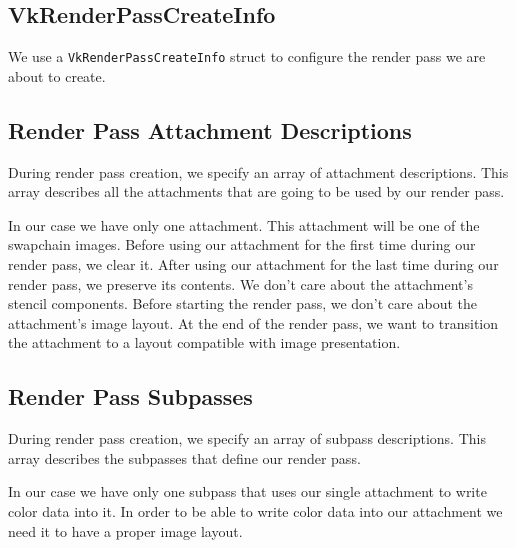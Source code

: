\subsection{VkRenderPassCreateInfo}

We use a \texttt{VkRenderPassCreateInfo} struct to configure the render pass we
are about to create.

\begin{minipage}{\linewidth}{\noindent}
    
\end{minipage}

\subsection{Render Pass Attachment Descriptions}

During render pass creation, we specify an array of attachment descriptions.
This array describes all the attachments that are going to be used by our
render pass.

In our case we have only one attachment.
This attachment will be one of the swapchain images.
Before using our attachment for the first time during our render pass, we clear it.
After using our attachment for the last time during our render pass, we preserve
its contents.
We don't care about the attachment's stencil components.
Before starting the render pass, we don't care about the attachment's image layout.
At the end of the render pass, we want to transition the attachment to a layout
compatible with image presentation.

\begin{minipage}{\linewidth}{\noindent}
    
\end{minipage}

\subsection{Render Pass Subpasses}

During render pass creation, we specify an array of subpass descriptions.
This array describes the subpasses that define our render pass.

In our case we have only one subpass that uses our single attachment to write
color data into it.
In order to be able to write color data into our attachment we need it to have
a proper image layout.


